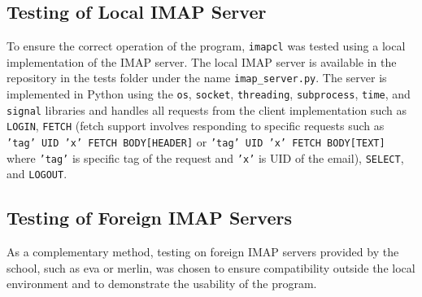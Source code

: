 \documentclass[a4paper,11pt]{article}
\begin{document}
\subsection{Testing of Local IMAP Server}
To ensure the correct operation of the program, \texttt{imapcl} was tested using a local 
implementation of the IMAP server. The local IMAP server is available in the repository 
in the tests folder under the name \texttt{imap\_server.py}. The server is implemented in Python 
using the \texttt{os}, \texttt{socket}, \texttt{threading}, \texttt{subprocess}, 
\texttt{time}, and \texttt{signal} libraries and handles all requests from the client 
implementation such as \texttt{LOGIN}, \texttt{FETCH} (fetch support involves responding to 
specific requests such as \texttt{'tag' UID 'x' FETCH BODY[HEADER]} or \texttt{'tag' UID 'x' FETCH BODY[TEXT]} 
where \texttt{'tag'} is specific tag of the request and \texttt{'x'} is UID of the email), 
\texttt{SELECT}, and \texttt{LOGOUT}.

\subsection{Testing of Foreign IMAP Servers}
As a complementary method, testing on foreign IMAP servers provided by the school, such as eva 
or merlin, was chosen to ensure compatibility outside the local environment and to demonstrate 
the usability of the program.
\end{document}
